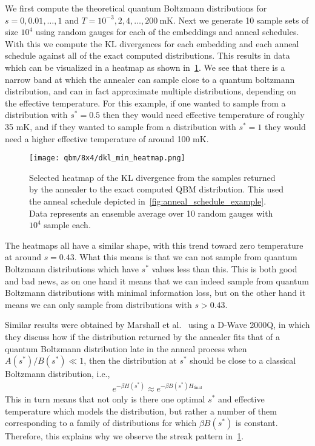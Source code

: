We first compute the theoretical quantum Boltzmann distributions for \( s = 0, 0.01, \dots, 1 \) and \( T = 10^{-3}, 2, 4, \dots, 200 \ \si{\milli\kelvin} \).
Next we generate 10 sample sets of size \( 10^4 \) using random gauges for each of the embeddings and anneal schedules.
With this we compute the KL divergences for each embedding and each anneal schedule against all of the exact computed distributions.
This results in data which can be visualized in a heatmap as shown in~\cref{fig:dkl_min_heatmap}.
We see that there is a narrow band at which the annealer can sample close to a quantum boltzmann distribution, and can in fact approximate multiple distributions, depending on the effective temperature.
For this example, if one wanted to sample from a distribution with \( s^* = 0.5 \) then they would need effective temperature of roughly 35 \si{\milli\kelvin}, and if they wanted to sample from a distribution with \( s^* = 1 \) they would need a higher effective temperature of around 100 \si{\milli\kelvin}.

\begin{figure}[!htb]
    \begin{center}
        \texttt{[image: qbm/8x4/dkl\_min\_heatmap.png]}
    \end{center}
    \caption{Selected heatmap of the KL divergence from the samples returned by the annealer to the exact computed QBM distribution. This used the anneal schedule depicted in~\cref{fig:anneal_schedule_example}. Data represents an ensemble average over 10 random gauges with \( 10^4 \) sample each.}
    \label{fig:dkl_min_heatmap}
\end{figure}

The heatmaps all have a similar shape, with this trend toward zero temperature at around \( s = 0.43 \).
What this means is that we can not sample from quantum Boltzmann distributions which have \( s^* \) values less than this.
This is both good and bad news, as on one hand it means that we can indeed sample from quantum Boltzmann distributions with minimal information loss, but on the other hand it means we can only sample from distributions with \( s > 0.43 \).

Similar results were obtained by Marshall et al.~\cite{marshall_2019} using a D-Wave 2000Q, in which they discuss how if the distribution returned by the annealer fits that of a quantum Boltzmann distribution late in the anneal process when \( A(s^*) / B(s^*) \ll 1 \), then the distribution at \( s^* \) should be close to a classical Boltzmann distribution, i.e.,
\begin{align}
    e^{-\beta H(s^*)} \approx e^{-\beta B(s^*) H_\text{final}}
\end{align}
This in turn means that not only is there one optimal \( s^* \) and effective temperature which models the distribution, but rather a number of them corresponding to a family of distributions for which \( \beta B(s^*) \) is constant.
Therefore, this explains why we observe the streak pattern in~\cref{fig:dkl_min_heatmap}.

